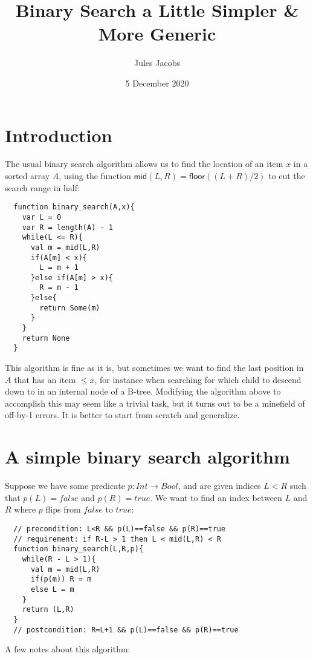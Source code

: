 \documentclass[a4paper, 11pt]{article}
\title{Binary Search a Little Simpler \& More Generic}
\author{Jules Jacobs}
\date{5 December 2020}
\begin{document}
\maketitle

\section{Introduction}

The usual binary search algorithm allows us to find the location of an item $x$ in a sorted array $A$, using the function $\mathsf{mid}(L,R) = \mathsf{floor}((L+R)/2)$ to cut the search range in half:

\begin{lstlisting}
  function binary_search(A,x){
    var L = 0
    var R = length(A) - 1
    while(L <= R){
      val m = mid(L,R)
      if(A[m] < x){
        L = m + 1
      }else if(A[m] > x){
        R = m - 1
      }else{
        return Some(m)
      }
    }
    return None
  }
\end{lstlisting}

This algorithm is fine as it is, but sometimes we want to find the last position in $A$ that has an item $\leq x$, for instance when searching for which child to descend down to in an internal node of a B-tree. Modifying the algorithm above to accomplish this may seem like a trivial task, but it turns out to be a minefield of off-by-1 errors. It is better to start from scratch and generalize.

\section{A simple binary search algorithm}

Suppose we have some predicate $p : Int \to Bool$, and are given indices $L < R$ such that $p(L) = false$ and $p(R) = true$. We want to find an index between $L$ and $R$ where $p$ flips from $false$ to $true$:

\begin{lstlisting}
  // precondition: L<R && p(L)==false && p(R)==true
  // requirement: if R-L > 1 then L < mid(L,R) < R
  function binary_search(L,R,p){
    while(R - L > 1){
      val m = mid(L,R)
      if(p(m)) R = m
      else L = m
    }
    return (L,R)
  }
  // postcondition: R=L+1 && p(L)==false && p(R)==true
\end{lstlisting}

\noindent A few notes about this algorithm:
\end{document}
